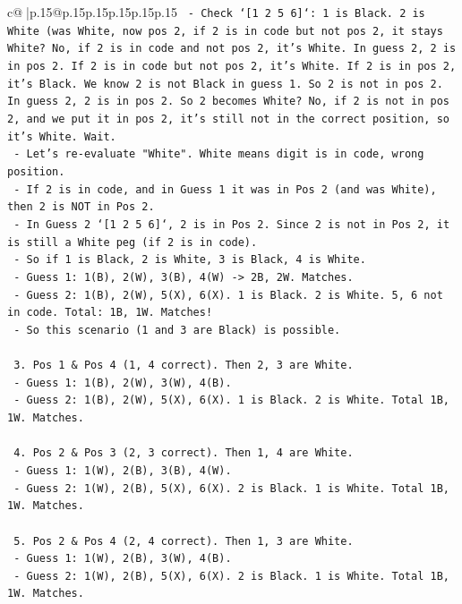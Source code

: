 \documentclass{article}
\begin{document}
{\begin{supertabular}{c@{$\;$}|p{.15\linewidth}@{}p{.15\linewidth}p{.15\linewidth}p{.15\linewidth}p{.15\linewidth}p{.15\linewidth}}
{{{\texttt{       {-} Check `{[}1 2 5 6{]}`: 1 is Black. 2 is White (was White, now pos 2, if 2 is in code but not pos 2, it stays White? No, if 2 is in code and not pos 2, it's White. In guess 2, 2 is in pos 2. If 2 is in code but not pos 2, it's White. If 2 is in pos 2, it's Black. We know 2 is not Black in guess 1. So 2 is not in pos 2. In guess 2, 2 is in pos 2. So 2 becomes White? No, if 2 is not in pos 2, and we put it in pos 2, it's still not in the correct position, so it's White. Wait.} \\
\texttt{       {-} Let's re{-}evaluate "White". White means digit is in code, wrong position.} \\
\texttt{       {-} If 2 is in code, and in Guess 1 it was in Pos 2 (and was White), then 2 is NOT in Pos 2.} \\
\texttt{       {-} In Guess 2 `{[}1 2 5 6{]}`, 2 is in Pos 2. Since 2 is not in Pos 2, it is still a White peg (if 2 is in code).} \\
\texttt{       {-} So if 1 is Black, 2 is White, 3 is Black, 4 is White.} \\
\texttt{       {-} Guess 1: 1(B), 2(W), 3(B), 4(W) {-}> 2B, 2W. Matches.} \\
\texttt{       {-} Guess 2: 1(B), 2(W), 5(X), 6(X). 1 is Black. 2 is White. 5, 6 not in code. Total: 1B, 1W. Matches!} \\
\texttt{       {-} So this scenario (1 and 3 are Black) is possible.} \\
\\ 
\texttt{    3. Pos 1 \& Pos 4 (1, 4 correct). Then 2, 3 are White.} \\
\texttt{       {-} Guess 1: 1(B), 2(W), 3(W), 4(B).} \\
\texttt{       {-} Guess 2: 1(B), 2(W), 5(X), 6(X). 1 is Black. 2 is White. Total 1B, 1W. Matches.} \\
\\ 
\texttt{    4. Pos 2 \& Pos 3 (2, 3 correct). Then 1, 4 are White.} \\
\texttt{       {-} Guess 1: 1(W), 2(B), 3(B), 4(W).} \\
\texttt{       {-} Guess 2: 1(W), 2(B), 5(X), 6(X). 2 is Black. 1 is White. Total 1B, 1W. Matches.} \\
\\ 
\texttt{    5. Pos 2 \& Pos 4 (2, 4 correct). Then 1, 3 are White.} \\
\texttt{       {-} Guess 1: 1(W), 2(B), 3(W), 4(B).} \\
\texttt{       {-} Guess 2: 1(W), 2(B), 5(X), 6(X). 2 is Black. 1 is White. Total 1B, 1W. Matches.} \\
}}}
\end{supertabular}}
\end{document}
